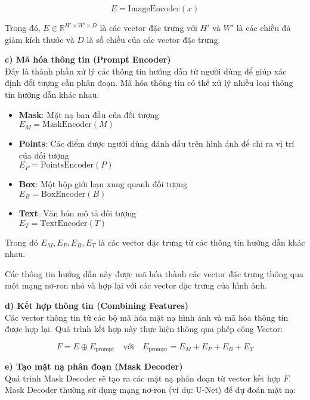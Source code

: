 \documentclass[12pt]{report}
\begin{document}
\[
E = \text{ImageEncoder}(x)
\]

Trong đó, \( E \in \mathbb{R}^{H' \times W' \times D} \) là các vector đặc trưng với \( H' \) và \( W' \) là các chiều đã giảm kích thước và \( D \) là số chiều của các vector đặc trưng.

\textbf{c) Mã hóa thông tin (Prompt Encoder)} \\
Đây là thành phần xử lý các thông tin hướng dẫn từ người dùng để giúp xác định đối tượng cần phân đoạn. Mã hóa thông tin có thể xử lý nhiều loại thông tin hướng dẫn khác nhau:

\begin{itemize}
    \item \textbf{Mask}: Mặt nạ ban đầu của đối tượng \\
    \quad \( E_M = \text{MaskEncoder}(M) \)
    
    \item \textbf{Points}: Các điểm được người dùng đánh dấu trên hình ảnh để chỉ ra vị trí của đối tượng \\
    \quad \( E_P = \text{PointsEncoder}(P) \)
    
    \item \textbf{Box}: Một hộp giới hạn xung quanh đối tượng \\
    \quad \( E_B = \text{BoxEncoder}(B) \)
    
    \item \textbf{Text}: Văn bản mô tả đối tượng \\
    \quad \( E_T = \text{TextEncoder}(T) \)
\end{itemize}

Trong đó \( E_M, E_P, E_B, E_T \) là các vector đặc trưng từ các thông tin hướng dẫn khác nhau.

Các thông tin hướng dẫn này được mã hóa thành các vector đặc trưng thông qua một mạng nơ-ron nhỏ và hợp lại với các vector đặc trưng của hình ảnh.

\textbf{d) Kết hợp thông tin (Combining Features)} \\
Các vector thông tin từ các bộ mã hóa mặt nạ hình ảnh và mã hóa thông tin được hợp lại. Quá trình kết hợp này thực hiện thông qua phép cộng Vector:

\[
F = E \oplus E_{\text{prompt}}
\quad \text{với} \quad
E_{\text{prompt}} = E_M + E_P + E_B + E_T
\]

\textbf{e) Tạo mặt nạ phân đoạn (Mask Decoder)} \\
Quá trình Mask Decoder sẽ tạo ra các mặt nạ phân đoạn từ vector kết hợp \( F \). Mask Decoder thường sử dụng mạng nơ-ron (ví dụ: U-Net) để dự đoán mặt nạ:
\end{document}
